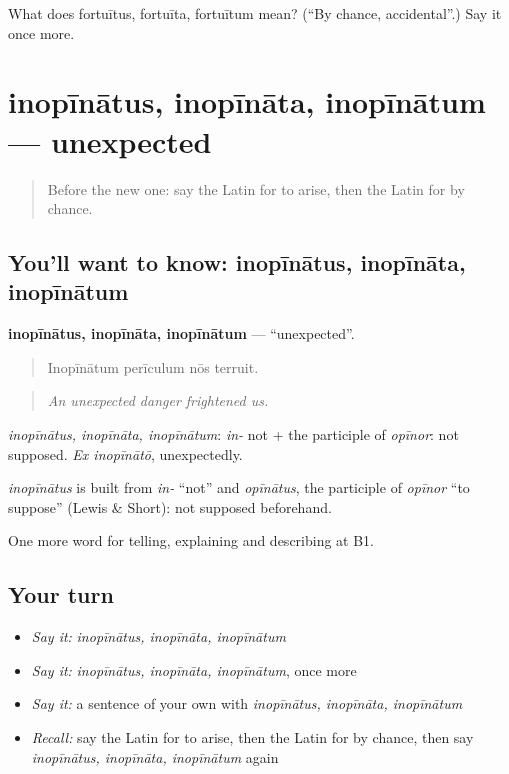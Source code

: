 \begin{tcolorbox}[breakable,colback=teal!4,colframe=teal!35!black,title={Before you move on}]
What does fortuītus, fortuīta, fortuītum mean? (\textquotedblleft{}By chance, accidental\textquotedblright{}.) Say it once more.
\end{tcolorbox}
\section[inopīnātus, inopīnāta, inopīnātum]{inopīnātus, inopīnāta, inopīnātum — unexpected}

\label{lesson:LA-C375-inopinatus}



\begin{quote}
Before the new one: say the Latin for to arise, then the Latin for by chance.
\end{quote}

\subsection*{You'll want to know: inopīnātus, inopīnāta, inopīnātum}
\textbf{inopīnātus, inopīnāta, inopīnātum} — \textquotedblleft{}unexpected\textquotedblright{}.

\begin{quote}
Inopīnātum perīculum nōs terruit.
\end{quote}

\begin{quote}
\emph{An unexpected danger frightened us.}
\end{quote}

\emph{inopīnātus, inopīnāta, inopīnātum}: \emph{in-} not + the participle of \emph{opīnor}: not supposed. \emph{Ex inopīnātō}, unexpectedly.

\begin{cousinweb}
\emph{inopīnātus} is built from \emph{in-} \textquotedblleft{}not\textquotedblright{} and \emph{opīnātus}, the participle of \emph{opīnor} \textquotedblleft{}to suppose\textquotedblright{} (Lewis \& Short): not supposed beforehand.
\end{cousinweb}

\begin{grammarlens}[title={What you've built}]
One more word for telling, explaining and describing at B1.
\end{grammarlens}

\subsection*{Your turn}
\begin{itemize}
\raggedright
  \item \emph{Say it:} \emph{inopīnātus, inopīnāta, inopīnātum}
  \item \emph{Say it:} \emph{inopīnātus, inopīnāta, inopīnātum}, once more
  \item \emph{Say it:} a sentence of your own with \emph{inopīnātus, inopīnāta, inopīnātum}
  \item \emph{Recall:} say the Latin for to arise, then the Latin for by chance, then say \emph{inopīnātus, inopīnāta, inopīnātum} again
\end{itemize}


